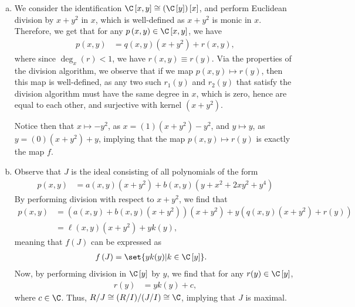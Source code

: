 \documentclass[10pt]{mypackage}
\begin{document}
\begin{solution}\hfill
  \begin{enumerate}[(a)]
    \item We consider the identification $\C\left[ x,y \right] \cong \left( \C\left[ y \right] \right)\left[ x \right]$, and perform Euclidean division by $x + y^2$ in $x$, which is well-defined as $x + y^2$ is monic in $x$. Therefore, we get that for any $p\left( x,y \right)\in \C\left[ x,y \right]$, we have
      \begin{align*}
        p\left( x,y \right) &= q\left( x,y \right)\left( x + y^2 \right) + r\left( x,y \right),
      \end{align*}
      where since $\deg_{x}\left( r \right) < 1$, we have $r\left( x,y \right) \equiv r(y)$. Via the properties of the division algorithm, we observe that if we map $p\left( x,y \right) \mapsto r\left( y \right)$, then this map is well-defined, as any two such $r_1\left( y \right)$ and $r_2\left( y \right)$ that satisfy the division algorithm must have the same degree in $x$, which is zero, hence are equal to each other, and surjective with kernel $\left( x + y^2 \right)$.\newline

      Notice then that $x\mapsto -y^2$, as $x = \left( 1 \right)\left( x+y^2 \right) - y^2$, and $y\mapsto y$, as $y = \left( 0 \right)\left( x + y^2 \right) + y$, implying that the map $p\left( x,y \right)\mapsto r\left( y \right)$ is exactly the map $f$.
    \item Observe that $J$ is the ideal consisting of all polynomials of the form
      \begin{align*}
        p\left( x,y \right) &= a\left( x,y \right)\left( x + y^2 \right) + b\left( x,y \right)\left( y + x^2 + 2xy^2 + y^4 \right)
      \end{align*}
      By performing division with respect to $x + y^2$, we find that
      \begin{align*}
        p\left( x,y \right) &= \left( a\left( x,y \right) + b\left( x,y \right)\left( x + y^2 \right) \right)\left( x + y^2 \right) + y\left( q\left( x,y \right)\left( x + y^2 \right) + r\left( y \right) \right)\\
                            &= \ell\left( x,y \right)\left( x + y^2 \right) + yk(y),
      \end{align*}
      meaning that $f(J)$ can be expressed as
      \begin{align*}
        f\left( J \right) &= \set{yk(y) | k\in \C\left[ y \right]}.
      \end{align*}
      Now, by performing division in $\C\left[ y \right]$ by $y$, we find that for any $r(y)\in \C\left[ y \right]$,
      \begin{align*}
        r(y) &= yk\left( y \right) + c,
      \end{align*}
      where $c \in \C$. Thus, $R/J\cong (R/I)/(J/I)\cong \C$, implying that $J$ is maximal.
  \end{enumerate}
\end{solution}
\end{document}
